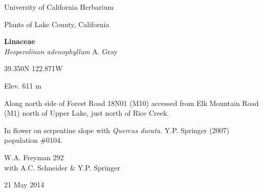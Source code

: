 \documentclass[letterpaper,10pt]{article}
\begin{document}
\begin{minipage}[t]{0.40\textwidth}

\begin{center}
University of California Herbarium \\
\begin{large}
Plants of Lake County, California \\
\end{large}
\vspace{\baselineskip}
\textbf{Linaceae} \\
\textit{Hesperolinon adenophyllum} A. Gray\\
\end{center}

\begin{footnotesize}

\begin{multicols}{2}
39.350\textdegree N 122.871\textdegree W
\columnbreak
\begin{flushright}
Elev. 611 m
\end{flushright}
\end{multicols}

Along north side of Forest Road 18N01 (M10) accessed from Elk Mountain Road (M1) north of Upper Lake, just north of Rice Creek.
\vspace{\baselineskip}

In flower on serpentine slope with \textit{Quercus durata}. Y.P. Springer (2007) population \#0104.

\begin{multicols}{2}
W.A. Freyman 292 \\
with A.C. Schneider \& Y.P. Springer
\columnbreak
\begin{flushright}
21 May 2014
\end{flushright}
\end{multicols}

\end{footnotesize}

\end{minipage}
%
\hspace{2cm}
%
\end{document}
